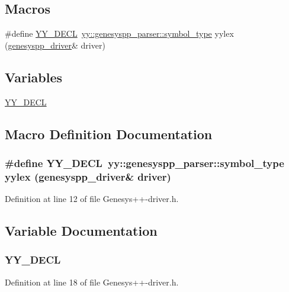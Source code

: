 \subsection*{Macros}
\begin{DoxyCompactItemize}
\item 
\#define \hyperlink{_genesys_09_09-driver_8h_ae5b01ac2fa5a6ad5fb97559638abe686}{Y\-Y\-\_\-\-D\-E\-C\-L}~\hyperlink{classyy_1_1genesyspp__parser_a5b9a172d481d4a62555ee11a7957e789}{yy\-::genesyspp\-\_\-parser\-::symbol\-\_\-type} yylex (\hyperlink{classgenesyspp__driver}{genesyspp\-\_\-driver}\& driver)
\end{DoxyCompactItemize}
\subsection*{Variables}
\begin{DoxyCompactItemize}
\item 
\hyperlink{_genesys_09_09-driver_8h_abcefb20c54ce0f92452cfbb9cf657670}{Y\-Y\-\_\-\-D\-E\-C\-L}
\end{DoxyCompactItemize}


\subsection{Macro Definition Documentation}
\hypertarget{_genesys_09_09-driver_8h_ae5b01ac2fa5a6ad5fb97559638abe686}{
\subsubsection[{Y\-Y\-\_\-\-D\-E\-C\-L}]{\setlength{\rightskip}{0pt plus 5cm}\#define Y\-Y\-\_\-\-D\-E\-C\-L~{\bf yy\-::genesyspp\-\_\-parser\-::symbol\-\_\-type} yylex ({\bf genesyspp\-\_\-driver}\& driver)}}\label{_genesys_09_09-driver_8h_ae5b01ac2fa5a6ad5fb97559638abe686}


Definition at line 12 of file Genesys++-\/driver.\-h.



\subsection{Variable Documentation}
\hypertarget{_genesys_09_09-driver_8h_abcefb20c54ce0f92452cfbb9cf657670}{
\subsubsection[{Y\-Y\-\_\-\-D\-E\-C\-L}]{\setlength{\rightskip}{0pt plus 5cm}Y\-Y\-\_\-\-D\-E\-C\-L}}\label{_genesys_09_09-driver_8h_abcefb20c54ce0f92452cfbb9cf657670}


Definition at line 18 of file Genesys++-\/driver.\-h.

